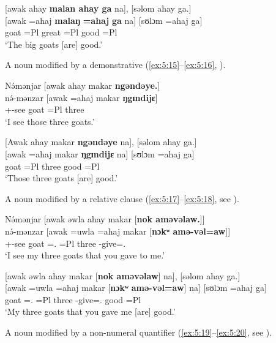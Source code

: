 \ea \label{ex:5:14}
{}[awak  ahay  \textbf{malan  ahay  ga}  na],  [səlom  ahay  ga.]\\
\gll {}[awak  =ahaj  \textbf{malaŋ}  \textbf{=ahaj}  \textbf{ga}   na]   [sʊlɔm   =ahaj   ga]\\
      goat    =Pl  great    =Pl  {\ADJ}  {\PSP}   good  =Pl  {\ADJ}\\
\glt  ‘The big goats [are] good.’
\z

A noun modified by a demonstrative (\ref{ex:5:15}--\ref{ex:5:16},  ).

\ea \label{ex:5:15}
N\'{ə}mənjar  [awak  ahay  makar \textbf{ngəndəye.}]\\
\gll  n\'{ə}-mənzar  [awak  =ahaj  makar  \textbf{ŋgɪndijɛ}]\\
      {\oneS}+{\IFV}-see  goat  =Pl  three  {\DEM}\\
\glt  ‘I see those three goats.’
\z

\ea \label{ex:5:16}
{}[Awak  ahay  makar \textbf{ngəndəye} na],  [səlom  ahay  ga.]\\
\gll  {}[awak   =ahaj   makar   \textbf{ŋgɪndijɛ}   na]   [sʊlɔm   =ahaj   ga]\\
      goat    =Pl  three  {\DEM}  {\PSP}  good  =Pl  {\ADJ}\\
\glt  ‘Those three goats [are] good.’
\z

A noun modified by a relative clause (\ref{ex:5:17}--\ref{ex:5:18}, see ).

\ea \label{ex:5:17}
N\'{ə}mənjar  [awak  əwla  ahay  makar  [\textbf{nok  aməvəlaw.}]]\\
\gll  n\'{ə}-mənzar  [awak  =uwla    =ahaj  makar  [\textbf{nɔkʷ} \textbf{amə-vəl=aw}]]\\
      {\oneS}+{\IFV}-see  goat  ={\oneS}.{\POSS}  =Pl  three  {\twoS}  {\DEP}-give={\oneS}.{\IO}\\
\glt  ‘I see my three goats that you gave to me.’
\z

\ea \label{ex:5:18}
{}[awak  əwla  ahay  makar  [\textbf{nok  aməvəlaw}]  na],  [səlom  ahay  ga.]\\
\gll  {}[awak   =uwla     =ahaj   makar   [\textbf{nɔkʷ} \textbf{amə-vəl=aw}]  na]   [sʊlɔm   =ahaj   ga]\\
      goat    ={\oneS}.{\POSS}  =Pl  three  {\twoS}  {\DEP}-give={\oneS}.{\IO}  {\PSP}  good  =Pl  {\ADJ}\\
\glt  ‘My three goats that you gave me [are] good.’
\z

A noun modified by a non-numeral quantifier (\ref{ex:5:19}--\ref{ex:5:20}, see ).


